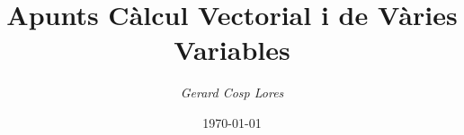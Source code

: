 \documentclass[12pt]{article}
\title{\textbf{Apunts Càlcul Vectorial i de Vàries Variables}}
\author{\textit{Gerard Cosp Lores}}
\date{\today}
\begin{document}
\justifying

\maketitle
\end{document}
